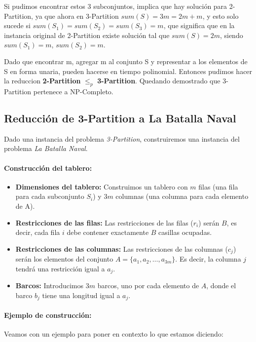 Si pudimos encontrar estos 3 subconjuntos, implica que hay solución para 2-Partition, ya que ahora en 3-Partition $sum(S) = 3m = 2m + m$, y esto solo sucede si $sum(S_1) = sum(S_2) = sum(S_3) = m$, que significa que en la instancia original de 2-Partition existe solución tal que $sum(S) = 2m$, siendo $sum(S_1) = m$, $sum(S_2) = m$.

Dado que encontrar m, agregar m al conjunto S y representar a los elementos de S en forma unaria, pueden hacerse en tiempo polinomial. Entonces pudimos hacer la reduccion \textbf{2-Partition} $\leq_p$ \textbf{3-Partition}. Quedando demostrado que 3-Partition pertenece a NP-Completo.


\subsection*{Reducción de 3-Partition a La Batalla Naval}

Dado una instancia del problema \textit{3-Partition}, construiremos una instancia del problema \textit{La Batalla Naval}.

\paragraph{Construcción del tablero:}
\begin{itemize}
    \item \textbf{Dimensiones del tablero:} Construimos un tablero con \(m\) filas (una fila para cada subconjunto \(S_i\)) y \(3m\) columnas (una columna para cada elemento de A).
    \item \textbf{Restricciones de las filas:} Las restricciones de las filas (\(r_i\)) serán \(B\), es decir, cada fila \(i\) debe contener exactamente \(B\) casillas ocupadas.
    \item \textbf{Restricciones de las columnas:} Las restricciones de las columnas (\(c_j\)) serán los elementos del conjunto \(A = \{a_1, a_2, \dots, a_{3m}\}\). Es decir, la columna \(j\) tendrá una restricción igual a \(a_j\).
    \item \textbf{Barcos:} Introducimos \(3m\) barcos, uno por cada elemento de \(A\), donde el barco \(b_j\) tiene una longitud igual a \(a_j\).
\end{itemize}

\paragraph{Ejemplo de construcción:}
Veamos con un ejemplo para poner en contexto lo que estamos diciendo:

